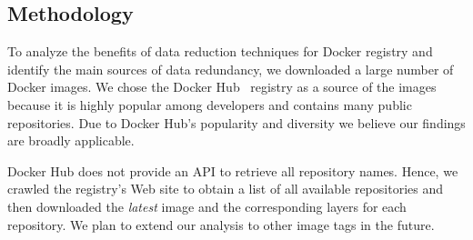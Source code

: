 \subsection{Methodology}
\label{sec:methodology}

%

To analyze the benefits of data reduction techniques for Docker registry and
identify the main sources of data redundancy, we downloaded a large number of
Docker images.
%
We chose the Docker Hub~\cite{docker-hub} registry as a source of the images
because it is highly popular among developers and contains many public
repositories.
%
Due to Docker Hub's popularity and diversity
we believe our findings are broadly applicable.

Docker Hub does not provide an API to retrieve all repository names.
Hence, we crawled the registry's Web site to obtain a list of all available repositories
and then downloaded the \emph{latest} image and the corresponding layers for
each repository.
%
%
%
We plan to extend our analysis to other image tags in the future.
%
%
%
